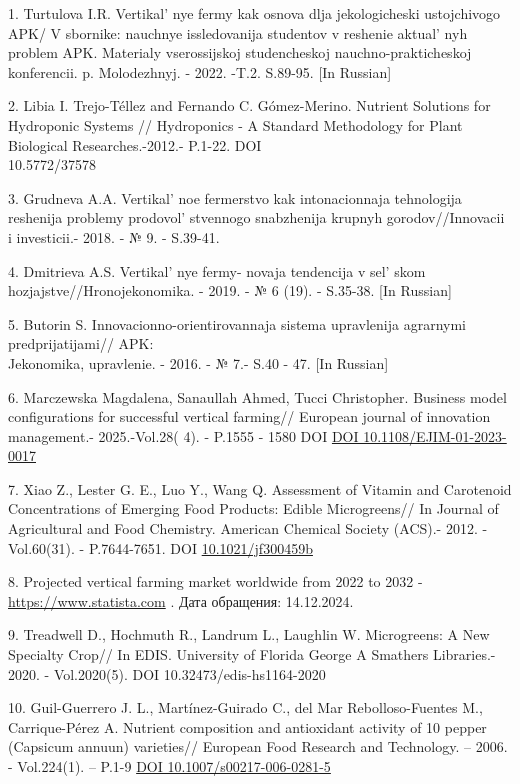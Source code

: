 \begin{references}
1. Turtulova I.R. Vertikal' nye fermy kak osnova dlja
jekologicheski ustojchivogo APK/ V sbornike: nauchnye issledovanija
studentov v reshenie aktual' nyh problem APK. Materialy
vserossijskoj studench\-eskoj nauchno-prakticheskoj konferencii. p.
Molodezhnyj. - 2022. -T.2. S.89-95. {[}In Russian{]}

2. Libia I. Trejo-Téllez and Fernando C. Gómez-Merino. Nutrient Solutions
for Hydroponic Systems // Hydroponics - A Standard Methodology for Plant
Biological Researches.-2012.- P.1-22. DOI \\10.5772/37578

3. Grudneva A.A. Vertikal' noe fermerstvo kak
intonacionnaja tehnologija reshenija problemy
prodovol' stvennogo snabzhenija krupnyh
gorodov//Innovacii i investicii.- 2018. - № 9. - S.39-41.

4. Dmitrieva A.S. Vertikal' nye fermy- novaja tendencija v
sel' skom hozjajstve//Hronojekonomika. - 2019. - № 6
(19). - S.35-38. {[}In Russian{]}

5. Butorin S. Innovacionno-orientirovannaja sistema upravlenija
agrarnymi predprijatijami// APK: \\Jekonomika, upravlenie. - 2016. - № 7.-
S.40 - 47. {[}In Russian{]}

6. Marczewska Magdalena, Sanaullah Ahmed, Tucci Christopher. Business
model configurations for suc\-cessful vertical farming// European journal
of innovation management.- 2025.-Vol.28( 4). - P.1555 - 1580 DOI
\href{http://dx.doi.org/10.1108/EJIM-01-2023-0017}{DOI 10.1108/EJIM-01-2023-0017}

7. Xiao Z., Lester G. E., Luo Y., Wang Q. Assessment of Vitamin and
Carotenoid Concentrations of Emerging Food Products: Edible
Microgreens// In Journal of Agricultural and Food Chemistry. American
Chemical Society (ACS).- 2012. -Vol.60(31). - P.7644-7651. DOI
\href{https://doi.org/10.1021/jf300459b}{10.1021/jf300459b}

8. Projected vertical farming market worldwide from 2022 to 2032 -
\href{https://www.statista.com/statistics/487666/projection-vertical-farming-market-worldwide/}{https://www.statista.com}
. Дата обращения: 14.12.2024.

9. Treadwell D., Hochmuth R., Landrum L., Laughlin W. Microgreens: A New
Specialty Crop// In EDIS. University of Florida George A Smathers
Libraries.- 2020. - Vol.2020(5). DOI 10.32473/edis-hs1164-2020

10. Guil-Guerrero J. L., Martínez-Guirado C., del Mar Rebolloso-Fuentes
M., Carrique-Pérez A. Nutrient composition and antioxidant activity of
10 pepper (Capsicum annuun) varieties// European Food Research and
Technology. -- 2006. - Vol.224(1). -- P.1-9
\href{https://doi.org/10.1007/s00217-006-0281-5}{DOI
10.1007/s00217-006-0281-5}


\end{references}
